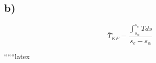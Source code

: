 

\subsection*{b)}

\[
\overline{T}_{KF} = \frac{\int_{s_\alpha}^{s_e} T ds}{s_e - s_\alpha}
\]


``````latex